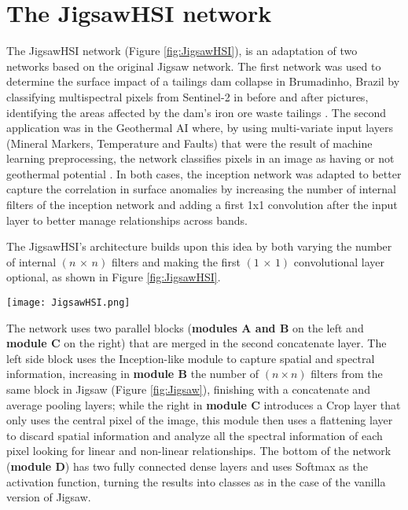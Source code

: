 \documentclass[lettersize, journal]{IEEEtran}
\begin{document}
\section{The JigsawHSI network}
The JigsawHSI network (Figure \ref{fig:JigsawHSI}), is an adaptation of two networks based on the original Jigsaw network. 
The first network was used to determine the surface impact of a tailings dam collapse in Brumadinho, Brazil by classifying multispectral pixels from Sentinel-2 in before and after pictures, identifying the areas affected by the dam's iron ore waste tailings \cite{moraga_monitoring_2020}. The second application was in the Geothermal AI where, by using multi-variate input layers (Mineral Markers, Temperature and Faults) that were the result of machine learning preprocessing, the network classifies pixels in an image as having or not geothermal potential \cite{moraga_geothermal_2022}.  In both cases, the inception network \cite{szegedy_inception-v4_2017} was adapted to better capture the correlation in surface anomalies by increasing the number of internal filters of the inception network and adding a first 1x1 convolution after the input layer to better manage relationships across bands.

The JigsawHSI's architecture builds upon this idea by both varying the number of internal $(n \, \times \, n)$ filters and making the first $(1 \, \times \, 1)$ convolutional layer optional, as shown in Figure \ref{fig:JigsawHSI}.

\begin{figure*}[!htb]
    \centering
    \texttt{[image: JigsawHSI.png]}
    \caption{JigsawHSI architecture. The dotted lined layers are optional}
    \label{fig:JigsawHSI}
\end{figure*}

The network uses two parallel blocks (\textbf{modules A and B} on the left and \textbf{module C} on the right) that are merged in the second concatenate layer. The left side block uses the Inception-like module to capture spatial and spectral information, increasing in \textbf{module B} the number of $(n \times n)$ filters from the same block in Jigsaw (Figure \ref{fig:Jigsaw}), finishing with a concatenate and average pooling layers; while the right in \textbf{module C} introduces a Crop layer that only uses the central pixel of the image, this module then uses a flattening layer to discard spatial information and analyze all the spectral information of each pixel looking for linear and non-linear relationships. The bottom of the  network (\textbf{module D}) has two fully connected dense layers and uses Softmax as the activation function, turning the results into classes as in the case of the vanilla version of Jigsaw.
\end{document}
